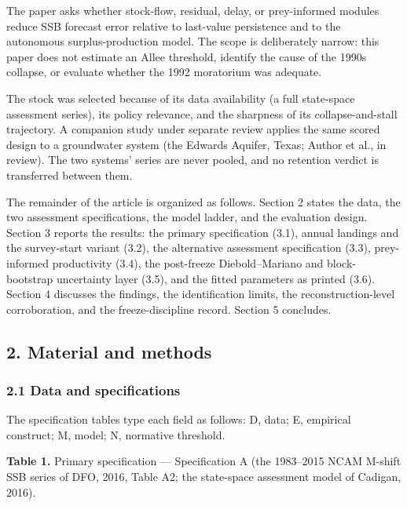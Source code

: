 \documentclass[11pt]{article}
\begin{document}
The paper asks whether stock-flow, residual, delay, or prey-informed
modules reduce SSB forecast error relative to last-value persistence and
to the autonomous surplus-production model. The scope is deliberately
narrow: this paper does not estimate an Allee threshold, identify the
cause of the 1990s collapse, or evaluate whether the 1992 moratorium was
adequate.

The stock was selected because of its data availability (a full
state-space assessment series), its policy relevance, and the sharpness
of its collapse-and-stall trajectory. A companion study under separate
review applies the same scored design to a groundwater system (the
Edwards Aquifer, Texas; Author et al., in review). The two systems'
series are never pooled, and no retention verdict is transferred between
them.

The remainder of the article is organized as follows. Section 2 states
the data, the two assessment specifications, the model ladder, and the
evaluation design. Section 3 reports the results: the primary
specification (3.1), annual landings and the survey-start variant (3.2),
the alternative assessment specification (3.3), prey-informed
productivity (3.4), the post-freeze Diebold--Mariano and block-bootstrap
uncertainty layer (3.5), and the fitted parameters as printed (3.6).
Section 4 discusses the findings, the identification limits, the
reconstruction-level corroboration, and the freeze-discipline record.
Section 5 concludes.

\subsection{2. Material and methods}\label{material-and-methods}

\subsubsection{2.1 Data and
specifications}\label{data-and-specifications}

The specification tables type each field as follows: D, data; E,
empirical construct; M, model; N, normative threshold.

\textbf{Table 1.} Primary specification --- Specification A (the
1983--2015 NCAM M-shift SSB series of DFO, 2016, Table A2; the
state-space assessment model of Cadigan, 2016).
\end{document}
